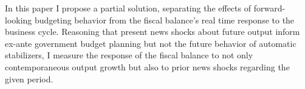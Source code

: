 \documentclass[12pt]{article}
\begin{document}
In this paper I propose a partial solution, separating the effects of forward-looking budgeting behavior from the fiscal balance's real time response to the business cycle. Reasoning that present news shocks about future output inform ex-ante government budget planning but not the future behavior of automatic stabilizers, I measure the response of the fiscal balance to not only contemporaneous output growth but also to prior news shocks regarding the given period.

\clearpage



\end{document}

